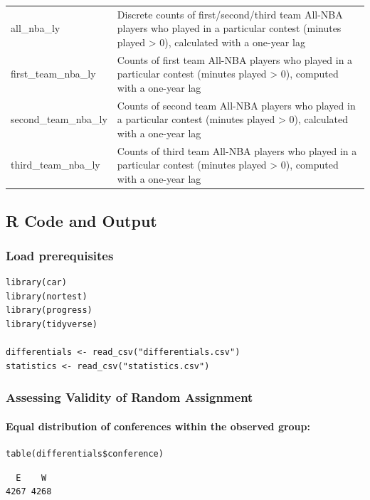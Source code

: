 \documentclass[
    12pt,
    a4paper,
    titlepage,  %
    abstract,  %
    headings=standardclasses,  %
    bibliography=totocnumbered  %
]{scrartcl}
\begin{document}
\begin{longtable}{|>{\ttfamily}l|L{4.17in}|}
     \\ \hline
    all\_nba\_ly & Discrete counts of first/second/third team All-NBA players who played in a particular contest (minutes played > 0), calculated with a one-year lag \\ \hline
    first\_team\_nba\_ly & Counts of first team All-NBA players who played in a particular contest (minutes played > 0), computed with a one-year lag \\ \hline
    second\_team\_nba\_ly & Counts of second team All-NBA players who played in a particular contest (minutes played > 0), calculated with a one-year lag \\ \hline
    third\_team\_nba\_ly & Counts of third team All-NBA players who played in a particular contest (minutes played > 0), computed with a one-year lag \\ \hline
\end{longtable}

\subsection{R Code and Output}

\subsubsection{Load prerequisites}

\begin{verbatim}
library(car)
library(nortest)
library(progress)
library(tidyverse)

differentials <- read_csv("differentials.csv")
statistics <- read_csv("statistics.csv")
\end{verbatim}

\subsubsection{Assessing Validity of Random Assignment} \label{random-assign}

\paragraph{Equal distribution of conferences within the observed group:}

\begin{verbatim}
table(differentials$conference)
\end{verbatim}

\begin{Verbatim}
  E    W 
4267 4268
\end{Verbatim}
\end{document}
